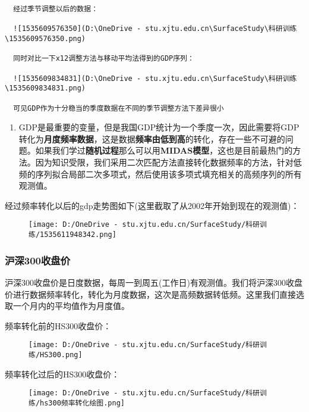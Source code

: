 \documentclass[]{article}
\begin{document}
\begin{verbatim}
  经过季节调整以后的数据：

  ![1535609576350](D:\OneDrive - stu.xjtu.edu.cn\SurfaceStudy\科研训练\1535609576350.png)

  同时对比一下x12调整方法与移动平均法得到的GDP序列：

  ![1535609834831](D:\OneDrive - stu.xjtu.edu.cn\SurfaceStudy\科研训练\1535609834831.png)

  可见GDP作为十分稳当的季度数据在不同的季节调整方法下差异很小
\end{verbatim}

\begin{enumerate}
\def\labelenumi{\arabic{enumi}.}
\item
  GDP是最重要的变量，但是我国GDP统计为一个季度一次，因此需要将GDP转化为\textbf{月度频率数据}，这是数据\textbf{频率由低到高}的转化，存在一些不可避的问题。如果我们学过\textbf{随机过程}那么可以用\textbf{MIDAS模型}，这也是目前最热门的方法。因为知识受限，我们采用二次匹配方法直接转化数据频率的方法，针对低频的序列拟合局部二次多项式，然后使用该多项式填充相关的高频序列的所有观测值。
\end{enumerate}

经过频率转化以后的gdp走势图如下(这里截取了从2002年开始到现在的观测值)：

\begin{figure}
\centering
\texttt{[image: D:/OneDrive - stu.xjtu.edu.cn/SurfaceStudy/科研训练/1535611948342.png]}
\caption{}
\end{figure}

\hypertarget{header-n81}{%
\subsubsection{沪深300收盘价}\label{header-n81}}

沪深300收盘价是日度数据，每周一到周五(工作日)有观测值。我们将沪深300收盘价进行数据频率转化，转化为月度数据，这次是高频数据转低频。这里我们直接选取一个月内的平均值作为月度值。

频率转化前的HS300收盘价：

\begin{figure}
\centering
\texttt{[image: D:/OneDrive - stu.xjtu.edu.cn/SurfaceStudy/科研训练/HS300.png]}
\caption{}
\end{figure}

频率转化过后的HS300收盘价：

\begin{figure}
\centering
\texttt{[image: D:/OneDrive - stu.xjtu.edu.cn/SurfaceStudy/科研训练/hs300频率转化绘图.png]}
\caption{}
\end{figure}
\end{document}
